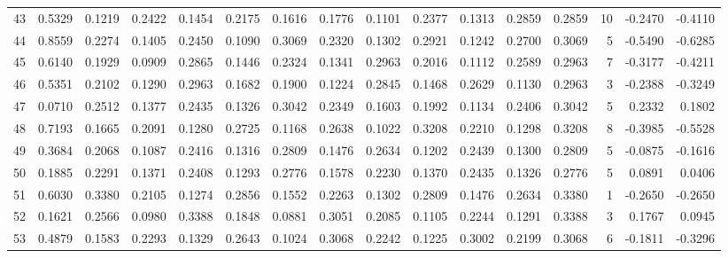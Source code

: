 \begin{tabular}{lrrrrrrrrrrrrrrr}
43  &      0.5329 &  0.1219 &  0.2422 &  0.1454 &  0.2175 &  0.1616 &  0.1776 &  0.1101 &  0.2377 &  0.1313 &   0.2859 &     0.2859 &     10 &                   -0.2470 &                    -0.4110 \\
44  &      0.8559 &  0.2274 &  0.1405 &  0.2450 &  0.1090 &  0.3069 &  0.2320 &  0.1302 &  0.2921 &  0.1242 &   0.2700 &     0.3069 &      5 &                   -0.5490 &                    -0.6285 \\
45  &      0.6140 &  0.1929 &  0.0909 &  0.2865 &  0.1446 &  0.2324 &  0.1341 &  0.2963 &  0.2016 &  0.1112 &   0.2589 &     0.2963 &      7 &                   -0.3177 &                    -0.4211 \\
46  &      0.5351 &  0.2102 &  0.1290 &  0.2963 &  0.1682 &  0.1900 &  0.1224 &  0.2845 &  0.1468 &  0.2629 &   0.1130 &     0.2963 &      3 &                   -0.2388 &                    -0.3249 \\
47  &      0.0710 &  0.2512 &  0.1377 &  0.2435 &  0.1326 &  0.3042 &  0.2349 &  0.1603 &  0.1992 &  0.1134 &   0.2406 &     0.3042 &      5 &                    0.2332 &                     0.1802 \\
48  &      0.7193 &  0.1665 &  0.2091 &  0.1280 &  0.2725 &  0.1168 &  0.2638 &  0.1022 &  0.3208 &  0.2210 &   0.1298 &     0.3208 &      8 &                   -0.3985 &                    -0.5528 \\
49  &      0.3684 &  0.2068 &  0.1087 &  0.2416 &  0.1316 &  0.2809 &  0.1476 &  0.2634 &  0.1202 &  0.2439 &   0.1300 &     0.2809 &      5 &                   -0.0875 &                    -0.1616 \\
50  &      0.1885 &  0.2291 &  0.1371 &  0.2408 &  0.1293 &  0.2776 &  0.1578 &  0.2230 &  0.1370 &  0.2435 &   0.1326 &     0.2776 &      5 &                    0.0891 &                     0.0406 \\
51  &      0.6030 &  0.3380 &  0.2105 &  0.1274 &  0.2856 &  0.1552 &  0.2263 &  0.1302 &  0.2809 &  0.1476 &   0.2634 &     0.3380 &      1 &                   -0.2650 &                    -0.2650 \\
52  &      0.1621 &  0.2566 &  0.0980 &  0.3388 &  0.1848 &  0.0881 &  0.3051 &  0.2085 &  0.1105 &  0.2244 &   0.1291 &     0.3388 &      3 &                    0.1767 &                     0.0945 \\
53  &      0.4879 &  0.1583 &  0.2293 &  0.1329 &  0.2643 &  0.1024 &  0.3068 &  0.2242 &  0.1225 &  0.3002 &   0.2199 &     0.3068 &      6 &                   -0.1811 &                    -0.3296 \\

\end{tabular}
